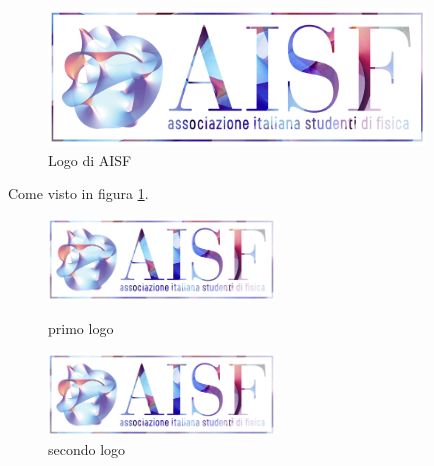 \documentclass[a4paper, 12pt]{article} %
\begin{document}

\begin{figure}[!htb] %
    \centering
    \includegraphics[width=10cm]{ai-sf.png}
    \caption{Logo di AISF}
    \label{fig:aisf}
\end{figure}



\noindent
Come visto in figura \ref{fig:aisf}.


\begin{figure}[H]
\begin{minipage}{.5\textwidth}
\centering
\includegraphics[width=6cm]{ai-sf.png}
\caption{primo logo}
\label{fig:logo1}
\end{minipage}
\begin{minipage}{.5\textwidth}
\centering
\includegraphics[width=6cm]{ai-sf.png}
\caption{secondo logo}
\label{fig:logo2}
\end{minipage}
\end{figure}
\end{document}
